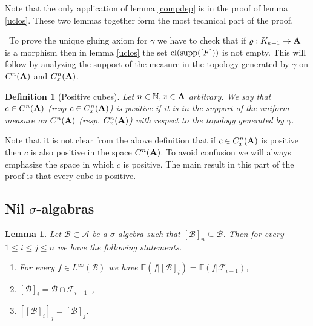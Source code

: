 \documentclass [11pt] {article}
\newtheorem{lemma}{Lemma}[section]
\newtheorem{definition}{Definition}[section]
\def\cl{{\rm cl}}
\def\bA{{\bf A}}
\begin{document}
Note that the only application of lemma \ref{compdep} is in the proof of lemma \ref{uclos}.
These two lemmas together form the most technical part of the proof.

\bigskip

~To prove the unique gluing axiom for $\gamma$ we have to check that if $\varrho:K_{k+1}\rightarrow\bA$ is a morphism then in lemma \ref{uclos} the set $\cl({\rm supp}([F]))$ is not empty.
This will follow by analyzing the support of the measure in the topology generated by $\gamma$ on $C^n(\bA)$ and $C_x^n(\bA)$. 

\begin{definition}[Positive cubes]\label{defposcube} Let $n\in\mathbb{N},x\in\bA$ arbitrary. We say that $c\in C^n(\bA)$ (resp $c\in C^n_x(\bA)$) is positive if it is in the support of the uniform measure on $C^n(\bA)$ (resp. $C^n_x(\bA)$) with respect to the topology generated by $\gamma$. 
\end{definition}

Note that it is not clear from the above definition that if $c\in C^n_x(\bA)$ is positive then $c$ is also positive in the space $C^n(\bA)$. To avoid confusion we will always emphasize the space in which $c$ is positive.
The main result in this part of the proof is that every cube is positive. 
 

\subsection{Nil $\sigma$-algabras}

\begin{lemma}\label{weaknilprop} Let $\mathcal{B}\subset\mathcal{A}$ be a $\sigma$-algebra such that $[\mathcal{B}]_n\subseteq\mathcal{B}$. Then for every $1\leq i\leq j\leq n$ we have the following statements.
\begin{enumerate}
\item For every $f\in L^\infty(\mathcal{B})$ we have $\mathbb{E}(f|[\mathcal{B}]_i)=\mathbb{E}(f|\mathcal{F}_{i-1})$,
\item $[\mathcal{B}]_i=\mathcal{B}\cap\mathcal{F}_{i-1}$~,
\item $[[\mathcal{B}]_i]_j=[\mathcal{B}]_j$.
\end{enumerate}
\end{lemma}
\end{document}
